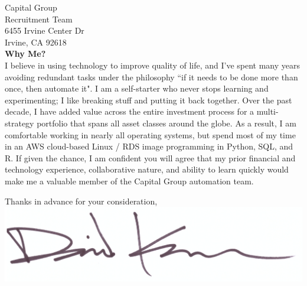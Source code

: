 \documentclass{letter}
\begin{document}
\begin{letter}{
  Capital Group \\
  Recruitment Team \\ 
  6455 Irvine Center Dr \\
  Irvine, CA 92618 \\
}
\textbf{Why Me?} \\
I believe in using technology to improve quality of life, and I've spent many
years avoiding redundant tasks under the philosophy ``if it needs to be done more
than once, then automate it". I am a self-starter who never stops learning and
experimenting; I like breaking stuff and putting it back together. Over the past
decade, I have added value across the entire investment process for a multi-strategy
portfolio that spans all asset classes around the globe. As a result, I am
comfortable working in nearly all operating systems, but spend most of my time in
an AWS cloud-based Linux / RDS image programming in Python, SQL, and R.
If given the chance, I am confident you will agree that my prior financial and
technology experience, collaborative nature, and ability to learn quickly would
make me a valuable member of the Capital Group automation team.

\closing{
  Thanks in advance for your consideration, \\
  \vspace{.33in}
  \includegraphics[scale=0.33]{signature.png}
}

\end{letter}
\end{document}
